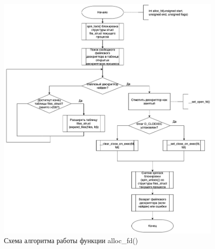 \begin{figure}[h!]
	\begin{center}
		\includegraphics[width=\textwidth]{images/alloc_fd}
	\end{center}
	\caption{Схема алгоритма работы функции alloc\_fd()}
	\label{img:alloc}
\end{figure}

